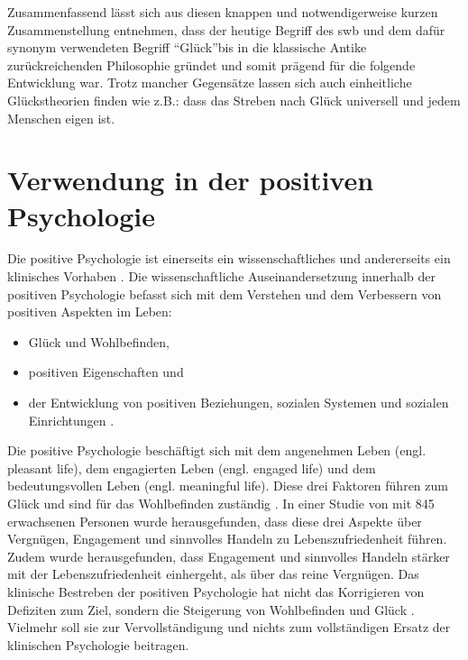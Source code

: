 Zusammenfassend lässt sich aus diesen knappen und notwendigerweise kurzen Zusammenstellung entnehmen, dass der heutige Begriff des \gls{swb} und dem dafür synonym verwendeten Begriff \textquotedblleft Glück\textquotedblright  bis in die klassische Antike zurückreichenden Philosophie gründet und somit prägend für die folgende Entwicklung war. Trotz mancher Gegensätze lassen sich auch einheitliche Glückstheorien finden wie z.B.: dass das Streben nach Glück universell und jedem Menschen eigen ist. 
  
\section{Verwendung in der positiven Psychologie}\label{sec.swbPospsy}
Die positive Psychologie ist einerseits ein wissenschaftliches und andererseits ein klinisches Vorhaben \cite{Carr:2011}. Die wissenschaftliche Auseinandersetzung innerhalb der positiven Psychologie befasst sich mit dem Verstehen und dem Verbessern von positiven Aspekten im Leben:
\begin{itemize}
\item Glück und Wohlbefinden,
\item positiven Eigenschaften und 
\item der Entwicklung von positiven Beziehungen, sozialen Systemen und sozialen Einrichtungen \cite{Lopez:2009,Seligman:2002}.
\end{itemize}
Die positive Psychologie beschäftigt sich mit dem angenehmen Leben (engl. pleasant life), dem engagierten Leben (engl. engaged life) und dem bedeutungsvollen Leben (engl. meaningful life). Diese drei Faktoren führen zum Glück und sind für das Wohlbefinden zuständig \cite{Carr:2011}. In einer Studie von  mit 845 erwachsenen Personen wurde herausgefunden, dass diese drei Aspekte über Vergnügen, Engagement und sinnvolles Handeln zu Lebenszufriedenheit führen. Zudem wurde herausgefunden, dass Engagement und sinnvolles Handeln stärker mit der Lebenszufriedenheit einhergeht, als über das reine Vergnügen. Das klinische Bestreben der positiven Psychologie hat nicht das Korrigieren von Defiziten zum Ziel, sondern die Steigerung von Wohlbefinden und Glück \cite{Carr:2011}. Vielmehr soll sie zur Vervollständigung und nichts zum vollständigen Ersatz der klinischen Psychologie beitragen.
